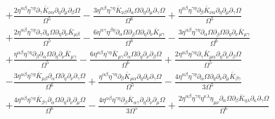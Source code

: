 \documentclass[10pt,letterpaper]{article}
\begin{document}
\begin{align}
& + \frac{2 \eta^{\alpha \beta} \eta^{\gamma \eta} \partial_{\gamma}\bar{K}_{\nu \alpha} \partial_{\eta}\partial_{\mu}\partial_{\beta}\Omega}{\Omega^5} -  \frac{3 \eta^{\alpha \beta} \eta^{\gamma \eta} \bar{K}_{\nu \beta} \partial_{\alpha}\Omega \partial_{\eta}\partial_{\mu}\partial_{\gamma}\Omega}{\Omega^6} + \frac{\eta^{\alpha \beta} \eta^{\gamma \eta} \partial_{\beta}\bar{K}_{\nu \alpha} \partial_{\eta}\partial_{\mu}\partial_{\gamma}\Omega}{\Omega^5} \nonumber \\
&+ \frac{2 \eta^{\alpha \beta} \eta^{\gamma \eta} \partial_{\gamma}\partial_{\alpha}\Omega \partial_{\eta}\partial_{\nu}\bar{K}_{\mu \beta}}{\Omega^5} -  \frac{6 \eta^{\alpha \gamma} \eta^{\beta \eta} \partial_{\alpha}\Omega \partial_{\beta}\Omega \partial_{\eta}\partial_{\nu}\bar{K}_{\mu \gamma}}{\Omega^6} -  \frac{3 \eta^{\alpha \beta} \eta^{\gamma \eta} \partial_{\alpha}\Omega \partial_{\beta}\Omega \partial_{\eta}\partial_{\nu}\bar{K}_{\mu \gamma}}{\Omega^6} \nonumber \\
&+ \frac{\eta^{\alpha \beta} \eta^{\gamma \eta} \partial_{\beta}\partial_{\alpha}\Omega \partial_{\eta}\partial_{\nu}\bar{K}_{\mu \gamma}}{\Omega^5} -  \frac{6 \eta^{\alpha \beta} \eta^{\gamma \eta} \bar{K}_{\mu \gamma} \partial_{\alpha}\Omega \partial_{\eta}\partial_{\nu}\partial_{\beta}\Omega}{\Omega^6} + \frac{2 \eta^{\alpha \beta} \eta^{\gamma \eta} \partial_{\gamma}\bar{K}_{\mu \alpha} \partial_{\eta}\partial_{\nu}\partial_{\beta}\Omega}{\Omega^5} \nonumber \\
&-  \frac{3 \eta^{\alpha \beta} \eta^{\gamma \eta} \bar{K}_{\mu \beta} \partial_{\alpha}\Omega \partial_{\eta}\partial_{\nu}\partial_{\gamma}\Omega}{\Omega^6} + \frac{\eta^{\alpha \beta} \eta^{\gamma \eta} \partial_{\beta}\bar{K}_{\mu \alpha} \partial_{\eta}\partial_{\nu}\partial_{\gamma}\Omega}{\Omega^5} -  \frac{4 \eta^{\alpha \beta} \eta^{\gamma \eta} \partial_{\alpha}\Omega \partial_{\eta}\partial_{\nu}\partial_{\mu}\bar{K}_{\beta \gamma}}{3 \Omega^5} \nonumber \\
&+ \frac{4 \eta^{\alpha \beta} \eta^{\gamma \eta} \bar{K}_{\beta \gamma} \partial_{\alpha}\Omega \partial_{\eta}\partial_{\nu}\partial_{\mu}\Omega}{\Omega^6} -  \frac{4 \eta^{\alpha \beta} \eta^{\gamma \eta} \partial_{\beta}\bar{K}_{\alpha \gamma} \partial_{\eta}\partial_{\nu}\partial_{\mu}\Omega}{3 \Omega^5} + \frac{2 \eta^{\alpha \beta} \eta^{\gamma \eta} \eta^{\kappa \lambda} \eta_{\mu \nu} \partial_{\alpha}\Omega \partial_{\beta}\bar{K}_{\eta \lambda} \partial_{\kappa}\partial_{\gamma}\Omega}{\Omega^6}\nonumber \\

\end{align}
\end{document}

